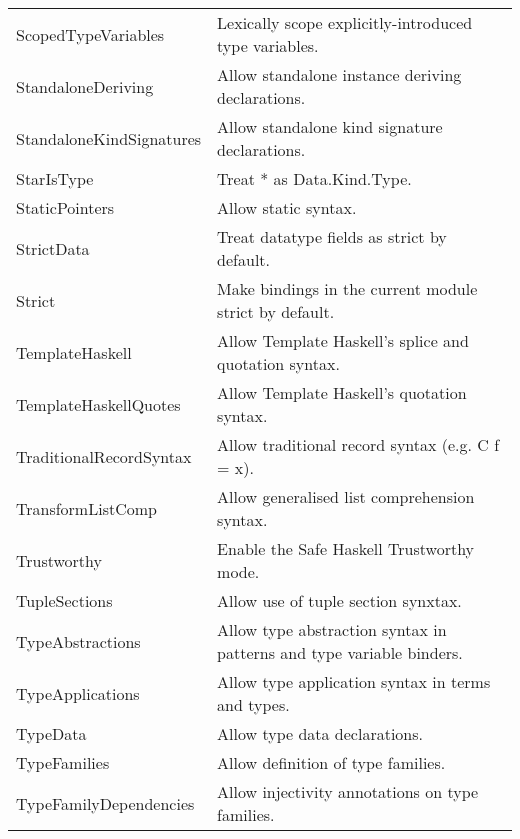 \documentclass[openany, 12pt]{book}
\begin{document}
\begin{center}
\begin{supertabular}{ll}
		ScopedTypeVariables        & Lexically scope explicitly-introduced type variables.                      \\
		StandaloneDeriving         & Allow standalone instance deriving declarations.                           \\
		StandaloneKindSignatures   & Allow standalone kind signature declarations.                              \\
		StarIsType                 & Treat * as Data.Kind.Type.                                                 \\
		StaticPointers             & Allow static syntax.                                                       \\
		StrictData                 & Treat datatype fields as strict by default.                                \\
		Strict                     & Make bindings in the current module strict by default.                     \\
		TemplateHaskell            & Allow Template Haskell's splice and quotation syntax.                      \\
		TemplateHaskellQuotes      & Allow Template Haskell's quotation syntax.                                 \\
		TraditionalRecordSyntax    & Allow traditional record syntax (e.g. C {f = x}).                          \\
		TransformListComp          & Allow generalised list comprehension syntax.                               \\
		Trustworthy                & Enable the Safe Haskell Trustworthy mode.                                  \\
		TupleSections              & Allow use of tuple section synxtax.                                        \\
		TypeAbstractions           & Allow type abstraction syntax in patterns and type variable binders.       \\
		TypeApplications           & Allow type application syntax in terms and types.                          \\
		TypeData                   & Allow type data declarations.                                              \\
		TypeFamilies               & Allow definition of type families.                                         \\
		TypeFamilyDependencies     & Allow injectivity annotations on type families.                            \\

\end{supertabular}
\end{center}
\end{document}
